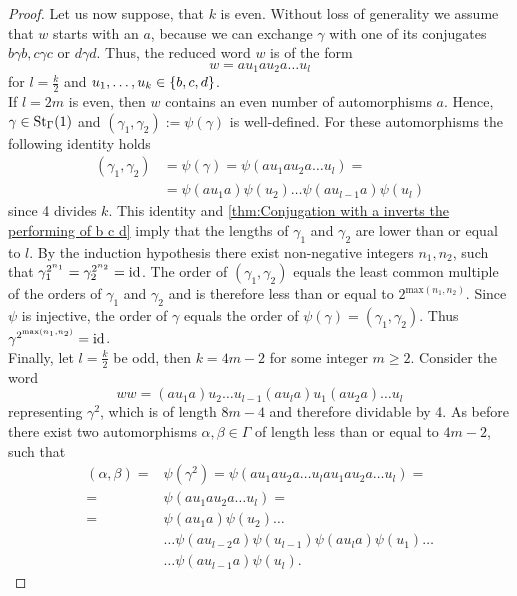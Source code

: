 \begin{proof}
Let us now suppose, that $k$ is even. Without loss of generality we assume that $w$ starts with an $a$, because we can exchange $\gamma$ with one of its conjugates $b\gamma b, c\gamma c$ or $d\gamma d$. Thus, the reduced word $w$ is of the form
\begin{equation*}
w=au_1 a u_2 a\ldots u_l
\end{equation*}
for $l=\frac{k}{2}$ and $\seq[k]{u}\in\lbrace b,c,d\rbrace$.\\
If $l=2m$ is even, then $w$ contains an even number of automorphisms $a$. Hence, $\gamma\in\St[\Gamma]{1}$ and $(\gamma_1,\gamma_2):=\psi(\gamma)$ is well-defined. For these automorphisms the following identity holds
\begin{align*}
(\gamma_1,\gamma_2)&=\psi(\gamma)=\psi(au_1 a u_2 a\ldots u_l)=\\
	&=\psi(au_1 a)\psi(u_2)\ldots\psi(au_{l-1}a)\psi(u_l)
\end{align*}
since 4 divides $k$. This identity and \cref{thm:Conjugation with a inverts the performing of b c d} imply that the lengths of $\gamma_1$ and $\gamma_2$ are lower than or equal to $l$. By the induction hypothesis there exist non-negative integers $n_1,n_2$, such that $\gamma_1^{2^{n_1}}=\gamma_2^{2^{n_2}}=\id$. The order of $(\gamma_1,\gamma_2)$ equals the least common multiple of the orders of $\gamma_1$ and $\gamma_2$ and is therefore less than or equal to $2^{\mathrm{max}(n_1,n_2)}$. Since $\psi$ is injective, the order of $\gamma$ equals the order of $\psi(\gamma)=(\gamma_1,\gamma_2)$. Thus $\gamma^{2^{\mathrm{max}(n_1,n_2)}}=\id$.\\
Finally, let $l=\frac{k}{2}$ be odd, then $k=4m-2$ for some integer $m\geq 2$. Consider the word
\begin{equation*}
ww=(au_1 a) u_2 \ldots u_{l-1}(au_la)u_1 (a u_2 a)\ldots u_l
\end{equation*}
representing $\gamma^2$, which is of length $8m-4$ and therefore dividable by 4. As before there exist two automorphisms $\alpha,\beta\in\Gamma$ of length less than or equal to $4m-2$, such that
\begin{align*}
(\alpha,\beta)=&\psi(\gamma^2)=\psi(au_1 a u_2 a\ldots u_lau_1 a u_2 a\ldots u_l)=\\
	=&\psi(au_1 a u_2 a\ldots u_l)=\\
	=&\psi(au_1 a)\psi(u_2)\ldots\\
	&\ldots\psi(au_{l-2}a)\psi(u_{l-1})\psi(au_l a)\psi(u_1)\ldots\\
	&\ldots\psi(au_{l-1}a)\psi(u_l).
\end{align*}

\end{proof}

